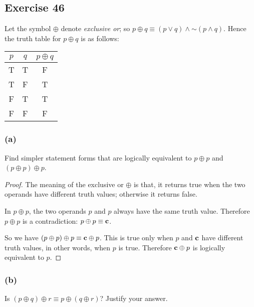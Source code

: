 \documentclass[14pt]{extarticle}
\newcommand{\false}{{\bf c}}
\begin{document}
\subsection{Exercise 46}
Let the symbol $\oplus$ denote {\it exclusive or}; so $p \oplus q \equiv (p \vee q) \wedge {\sim(p \wedge q)}$. Hence the truth table for $p \oplus q$ is as follows:

\begin{center}
    \begin{tabular}{|cc|c|}
        \hline
        $p$ & $q$ & $p \oplus q$ \\
        \hline
        T   & T   & F            \\
        \hline
        T   & F   & T            \\
        \hline
        F   & T   & T            \\
        \hline
        F   & F   & F            \\
        \hline
    \end{tabular}
\end{center}

\subsubsection{(a)}
Find simpler statement forms that are logically equivalent to $p \oplus p$ and $(p \oplus p) \oplus p$.

\begin{proof}
    The meaning of the exclusive or $\oplus$ is that, it returns true when the two operands have different truth values; otherwise it returns false.

    In $p \oplus p$, the two operands $p$ and $p$ always have the same truth value. Therefore $p \oplus p$ is a contradiction: $p \oplus p \equiv \false$.

    So we have $(p \oplus p) \oplus p \equiv \false \oplus p$. This is true only when $p$ and $\false$ have different truth values, in other words, when $p$ is true. Therefore $\false \oplus p$ is logically equivalent to $p$.
\end{proof}

\subsubsection{(b)}
Is $(p \oplus q) \oplus r \equiv p \oplus (q \oplus r)$? Justify your answer.
\end{document}
